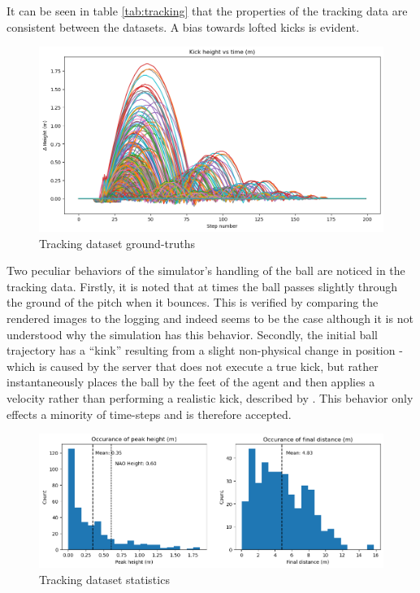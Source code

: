 \documentclass[a4paper,twoside,12pt]{report}
\begin{document}
It can be seen in table \ref{tab:tracking} that the properties of the tracking data are consistent between the datasets. A bias towards lofted kicks is evident.

\begin{figure}[h!]
\begin{center}
\includegraphics[width=14cm]{images/plotkicks.png}
\caption{Tracking dataset ground-truths}
\label{fig:plotkicks}
\end{center}
\end{figure}

Two peculiar behaviors of the simulator's handling of the ball are noticed in the tracking data. Firstly, it is noted that at times the ball passes slightly through the ground of the pitch when it bounces. This is verified by comparing the rendered images to the logging and indeed seems to be the case although it is not understood why the simulation has this behavior. Secondly, the initial ball trajectory has a ``kink'' resulting from a slight non-physical change in position - which is caused by the server that does not execute a true kick, but rather instantaneously places the ball by the feet of the agent and then applies a velocity rather than performing a realistic kick, described by \cite{fatproxy}. This behavior only effects a minority of time-steps and is therefore accepted.

\begin{figure}[h!]
\begin{center}
\includegraphics[width=14cm]{images/trackingplot.png}
\caption{Tracking dataset statistics}
\label{fig:trackplot}
\end{center}
\end{figure}
\end{document}
